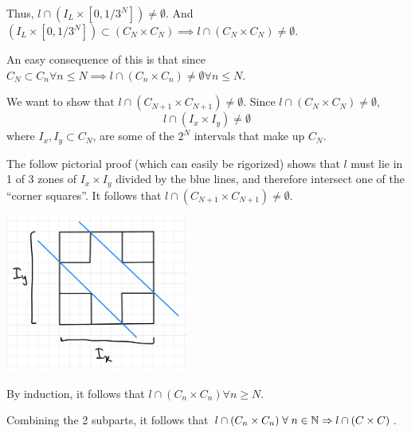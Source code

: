 \documentclass[a4paper, 12pt]{article}
\begin{document}
\begin{solution}
    Thus, $l \cap (I_L \times [0, 1/3^N]) \neq \emptyset$. And $(I_L \times [0, 1/3^N]) \subset (C_N \times C_N) \implies l \cap (C_N \times C_N) \neq \emptyset$.

    An easy consequence of this is that since $C_N \subset C_n \forall n \leq N \implies l \cap (C_n \times C_n) \neq \emptyset \forall n \leq N$.

    We want to show that $l \cap (C_{N+1} \times C_{N+1}) \neq \emptyset$. Since $l \cap (C_N \times C_N) \neq \emptyset$, \[
        l \cap (I_x \times I_y) \neq \emptyset
    \]
    where $I_x, I_y \subset C_N$, are some of the $2^N$ intervals that make up $C_N$.

    The follow pictorial proof (which can easily be rigorized) shows that $l$ must lie in 1 of 3 zones of $I_x \times I_y$ divided by the blue lines, and therefore intersect one of the ``corner squares''. It follows that $l \cap (C_{N+1} \times C_{N+1}) \neq \emptyset$.
    \begin{center}
        \includegraphics[width=6cm]{./figures/cantorfigure3.jpeg}
    \end{center}

    By induction, it follows that $l \cap (C_n \times C_n) \forall n \geq N$.

    Combining the 2 subparts, it follows that $l \cap (C_n \times C_n) \forall n \in \bbn \implies l \cap (C \times C)$.
\end{solution}
\end{document}
